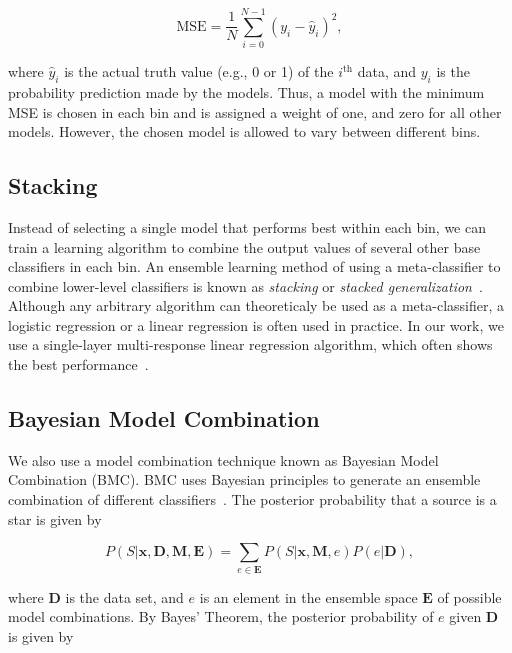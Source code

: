 \documentclass[useAMS,usenatbib]{mn2e}
\newcommand{\eg}{{e.g., }}
\begin{document}
\begin{equation}
  \mathrm{MSE} = \frac{1}{N} \sum^{N - 1}_{i = 0}
  \left( y_i - \hat{y}_i \right)^2,
  \label{eq:mse}
\end{equation}

\noindent
where $\hat{y}_i$ is the actual truth value
(\eg 0 or 1) of the $i^{\text{th}}$ data, 
and $y_{i}$ is the probability prediction made by the models.
Thus, a model with the minimum MSE is chosen in each bin
and is assigned a weight of one,
and zero for all other models.
However, the chosen model is allowed to vary between different bins.

\subsection{Stacking}

Instead of selecting a single model that performs best within each bin,
we can train a learning algorithm to combine the output values of
several other base classifiers in each bin.
An ensemble learning method of using a meta-classifier
to combine lower-level classifiers is known as \textit{stacking}
or \textit{stacked generalization}~\citep{wolpert1992stacked}.
Although any arbitrary algorithm
can theoreticaly be used as a meta-classifier,
a logistic regression or a linear regression is often used
in practice.
In our work,
we use a single-layer multi-response linear regression algorithm,
which often shows the best performance~\citep{breiman1996stacked, ting1999issues}.


\subsection{Bayesian Model Combination}

We also use a model combination technique \citep{Monteith2011} known as
Bayesian Model Combination (BMC).
BMC uses Bayesian principles to generate an ensemble combination of
different classifiers~\citep{Monteith2011}.
The posterior probability that a source is a star is given by

\begin{equation}
  P \left(S | \mathbf{x}, \mathbf{D}, \mathbf{M}, \mathbf{E} \right)
  = \sum_{e \in \mathbf{E}} P \left(S | \mathbf{x}, \mathbf{M}, e \right)
  P \left(e | \mathbf{D} \right),
  \label{eq:p_star_bmc}
\end{equation}

\noindent
where $\mathbf{D}$ is the data set,
and $e$ is an element in the ensemble space $\mathbf{E}$ of possible model combinations.
By Bayes' Theorem, the posterior probability of $e$ given $\mathbf{D}$ is given by
\end{document}
